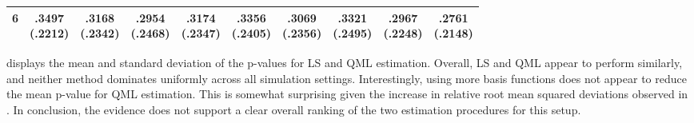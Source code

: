 \documentclass[12pt,a4paper]{article}
\theoremstyle{definition}
\begin{document}
\begin{table}[ht]
\begin{tabular}{c ccc ccc ccc}
6 & \makecell[c]{.3497 \\[-2pt] (.2212)} & \makecell[c]{.3168 \\[-2pt] (.2342)} & \makecell[c]{.2954 \\[-2pt] (.2468)} & \makecell[c]{.3174 \\[-2pt] (.2347)} & \makecell[c]{.3356 \\[-2pt] (.2405)} & \makecell[c]{.3069 \\[-2pt] (.2356)} & \makecell[c]{.3321 \\[-2pt] (.2495)} & \makecell[c]{.2967 \\[-2pt] (.2248)} & \makecell[c]{.2761 \\[-2pt] (.2148)} \\
\bottomrule
\end{tabular}
\end{table}
 displays the mean and standard deviation of the p-values for LS and QML estimation. Overall, LS and QML appear to perform similarly, and neither method dominates uniformly across all simulation settings. Interestingly, using more basis functions does not appear to reduce the mean p-value for QML estimation. This is somewhat surprising given the increase in relative root mean squared deviations observed in . In conclusion, the evidence does not support a clear overall ranking of the two estimation procedures for this setup.
\end{document}
